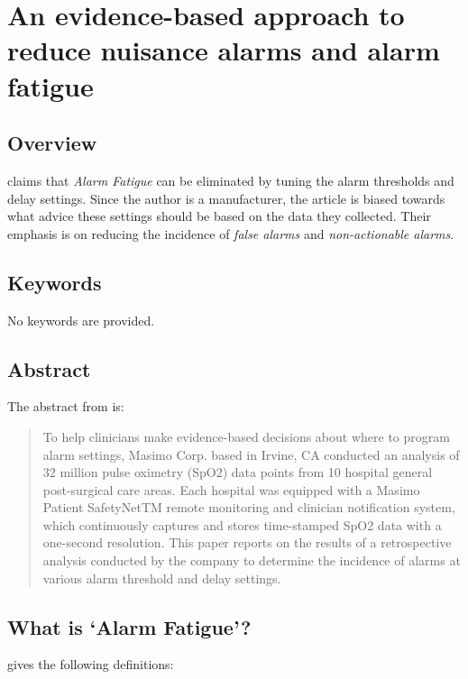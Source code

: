 \chapter{An evidence-based approach to reduce nuisance alarms and alarm fatigue}

\section{Overview}

\citet{welch2011evidence} claims that \textit{Alarm Fatigue} can be eliminated by tuning the alarm thresholds and delay settings. Since the author is a manufacturer, the article is biased towards what advice these settings should be based on the data they collected. Their emphasis is on reducing the incidence of \textit{false alarms} and \textit{non-actionable alarms}.

\section{Keywords}

No keywords are provided.

\section{Abstract}

The abstract from \citet{welch2012alarm} is: \\

\begin{quotation}
	To help clinicians make evidence-based
	decisions about where to program alarm
	settings, Masimo Corp. based in Irvine, CA
	conducted an analysis of 32 million pulse
	oximetry (SpO2) data points from 10 hospital
	general post-surgical care areas. Each hospital
	was equipped with a Masimo Patient
	SafetyNetTM remote monitoring and clinician
	notification system, which continuously
	captures and stores time-stamped SpO2 data
	with a one-second resolution. This paper
	reports on the results of a retrospective analysis
	conducted by the company to determine the
	incidence of alarms at various alarm threshold
	and delay settings.
\end{quotation}

\section{What is `Alarm Fatigue'?}

\cite[p.49]{welch2011evidence} gives the following definitions: \\

